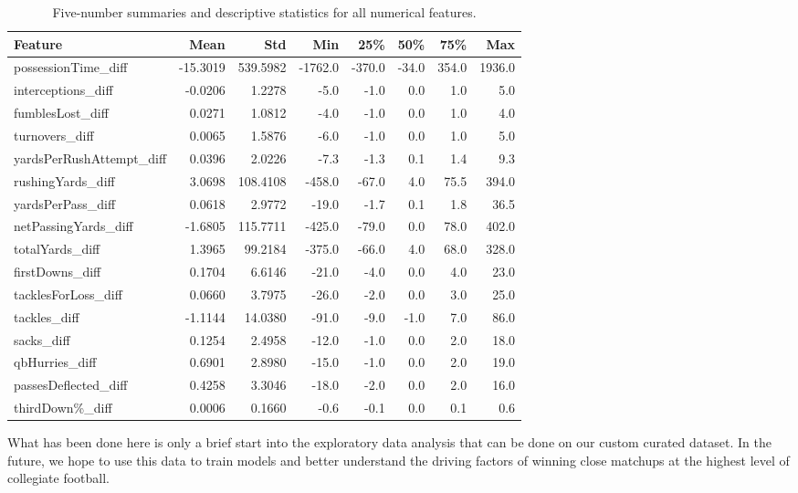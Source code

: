 \documentclass[10pt]{article}
\begin{document}
\begin{table}
\centering
\small
\begin{tabular}{lrrrrrrr}
\toprule
\textbf{Feature} & \textbf{Mean} & \textbf{Std} & \textbf{Min} & \textbf{25\%} & \textbf{50\%} & \textbf{75\%} & \textbf{Max} \\
\midrule
possessionTime\_diff      & -15.3019 & 539.5982 & -1762.0 & -370.0 &  -34.0 &  354.0 & 1936.0 \\
interceptions\_diff       &  -0.0206 &   1.2278 &    -5.0 &   -1.0 &    0.0 &    1.0 &    5.0 \\
fumblesLost\_diff         &   0.0271 &   1.0812 &    -4.0 &   -1.0 &    0.0 &    1.0 &    4.0 \\
turnovers\_diff           &   0.0065 &   1.5876 &    -6.0 &   -1.0 &    0.0 &    1.0 &    5.0 \\
yardsPerRushAttempt\_diff &   0.0396 &   2.0226 &    -7.3 &   -1.3 &    0.1 &    1.4 &    9.3 \\
rushingYards\_diff        &   3.0698 & 108.4108 &  -458.0 &   -67.0 &  4.0 &   75.5 &  394.0 \\
yardsPerPass\_diff        &   0.0618 &   2.9772 &   -19.0 &   -1.7 &    0.1 &    1.8 &   36.5 \\
netPassingYards\_diff     &  -1.6805 & 115.7711 &  -425.0 &   -79.0 &    0.0 &   78.0 &  402.0 \\
totalYards\_diff          &   1.3965 &  99.2184 &  -375.0 &   -66.0 &    4.0 &   68.0 &  328.0 \\
firstDowns\_diff          &   0.1704 &   6.6146 &   -21.0 &   -4.0 &    0.0 &    4.0 &   23.0 \\
tacklesForLoss\_diff      &   0.0660 &   3.7975 &   -26.0 &   -2.0 &    0.0 &    3.0 &   25.0 \\
tackles\_diff             &  -1.1144 &  14.0380 &   -91.0 &   -9.0 &   -1.0 &    7.0 &   86.0 \\
sacks\_diff               &   0.1254 &   2.4958 &   -12.0 &   -1.0 &    0.0 &    2.0 &   18.0 \\
qbHurries\_diff           &   0.6901 &   2.8980 &   -15.0 &   -1.0 &    0.0 &    2.0 &   19.0 \\
passesDeflected\_diff     &   0.4258 &   3.3046 &   -18.0 &   -2.0 &    0.0 &    2.0 &   16.0 \\
thirdDown\%\_diff         &   0.0006 &   0.1660 &   -0.6  &   -0.1 &    0.0 &    0.1 &   0.6 \\
\bottomrule
\end{tabular}
\caption{Five-number summaries and descriptive statistics for all numerical features.}
\label{tab:five_number_summary}
\end{table}

\newpage
What has been done here is only a brief start into the exploratory data analysis that can be done on our custom curated dataset. In the future, we hope to use this data to train models and better understand the driving factors of winning close matchups at the highest level of collegiate football.
\end{document}
